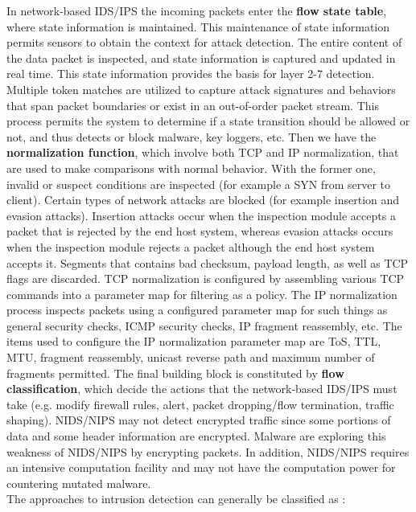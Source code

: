 \documentclass[11pt]{article}
\begin{document}
In network-based IDS/IPS the incoming packets enter the \textbf{flow state table}, where state information is maintained. This maintenance of state information permits sensors to obtain the context for attack detection. The entire content of the data packet is inspected, and state information is captured and updated in real time. This state information provides the basis for layer 2-7 detection. Multiple token matches are utilized to capture attack signatures and behaviors that span packet boundaries or exist in an out-of-order packet stream. This process permits the system to determine if a state transition should be allowed or not, and thus detects or block malware, key loggers, etc. Then we have the \textbf{normalization function}, which involve both TCP and IP normalization, that are used to make comparisons with normal behavior. With the former one, invalid or suspect conditions are inspected (for example a SYN from server to client). Certain types of network attacks are blocked (for example insertion and evasion attacks). Insertion attacks occur when the inspection module accepts a packet that is rejected by the end host system, whereas evasion attacks occurs when the inspection module rejects a packet although the end host system accepts it. Segments that contains bad checksum, payload length, as well as TCP flags are discarded. TCP normalization is configured by assembling various TCP commands into a parameter map for filtering as a policy. The IP normalization process inspects packets using a configured parameter map for such things as general security checks, ICMP security checks, IP fragment reassembly, etc. The items used to configure the IP normalization parameter map are ToS, TTL, MTU, fragment reassembly, unicast reverse path and maximum number of fragments permitted. The final building block is constituted by \textbf{flow classification}, which decide the actions that the network-based IDS/IPS must take (e.g. modify firewall rules, alert, packet dropping/flow termination, traffic shaping). NIDS/NIPS may not detect encrypted traffic since some portions of data and some header information are encrypted. Malware are exploring this weakness of NIDS/NIPS by encrypting packets. In addition, NIDS/NIPS requires an intensive computation facility and may not have the computation power for countering mutated malware.\\The approaches to intrusion detection can generally be classified as :
\end{document}
